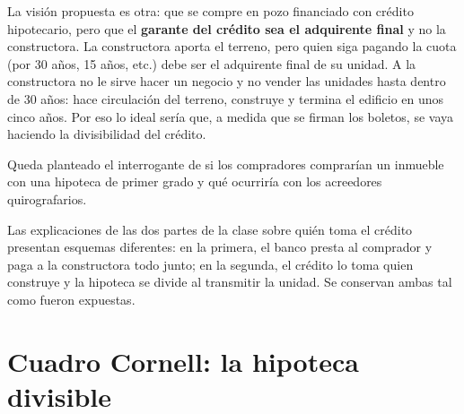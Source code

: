 \documentclass[12pt,oneside]{book}
\begin{document}
La visión propuesta es otra: que se compre en pozo financiado con crédito hipotecario, pero que el \textbf{garante del crédito sea el adquirente final} y no la constructora. La constructora aporta el terreno, pero quien siga pagando la cuota (por 30 años, 15 años, etc.) debe ser el adquirente final de su unidad. A la constructora no le sirve hacer un negocio y no vender las unidades hasta dentro de 30 años: hace circulación del terreno, construye y termina el edificio en unos cinco años. Por eso lo ideal sería que, a medida que se firman los boletos, se vaya haciendo la divisibilidad del crédito.

Queda planteado el interrogante de si los compradores comprarían un inmueble con una hipoteca de primer grado y qué ocurriría con los acreedores quirografarios.

\begin{note}
Las explicaciones de las dos partes de la clase sobre quién toma el crédito presentan esquemas diferentes: en la primera, el banco presta al comprador y paga a la constructora todo junto; en la segunda, el crédito lo toma quien construye y la hipoteca se divide al transmitir la unidad. Se conservan ambas tal como fueron expuestas.
\end{note}

\section{Cuadro Cornell: la hipoteca divisible}
\end{document}
